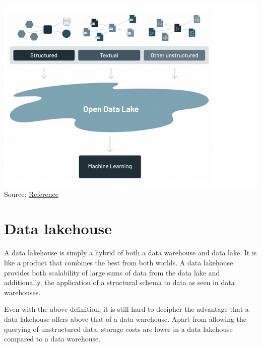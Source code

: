 \documentclass[
]{book}
\begin{document}
\includegraphics{./images/data_lake.png}
Source: \href{https://www.databricks.com/blog/2021/05/19/evolution-to-the-data-lakehouse.html}{Reference}

\hypertarget{data-lakehouse}{%
\section{Data lakehouse}\label{data-lakehouse}}

A data lakehouse is simply a hybrid of both a data warehouse and data lake. It is like a product that combines the best from both worlds. A data lakehouse provides both scalability of large sums of data from the data lake and additionally, the application of a structural schema to data as seen in data warehouses.

Even with the above definition, it is still hard to decipher the advantage that a data lakehouse offers above that of a data warehouse. Apart from allowing the querying of unstructured data, storage costs are lower in a data lakehouse compared to a data warehouse.
\end{document}
